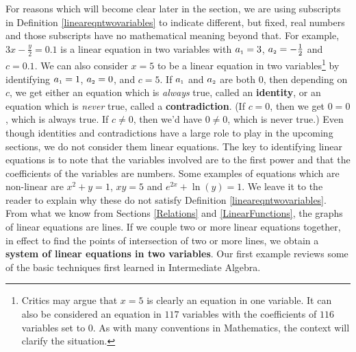 For reasons which will become clear later in the section, we are using subscripts in Definition \ref{lineareqntwovariables} to indicate different, but fixed, real numbers and those subscripts have no mathematical meaning beyond that.  For example, $3x - \frac{y}{2} = 0.1$ is a linear equation in two variables with $a_{\mbox{\tiny$1$}} = 3$, $a_{\mbox{\tiny$2$}} = -\frac{1}{2}$ and $c = 0.1$.  We can also consider $x = 5$ to be a linear equation in two variables\footnote{Critics may argue that $x=5$ is clearly an equation in one variable.  It can also be considered an equation in $117$ variables with the coefficients of $116$ variables set to $0$.  As with many conventions in Mathematics, the context will clarify the situation.} by identifying $a_{\mbox{\tiny$1$}} = 1$, $a_{\mbox{\tiny$2$}} = 0$, and $c = 5$.  If $a_{\mbox{\tiny$1$}}$ and $a_{\mbox{\tiny$2$}}$ are both $0$, then depending on $c$, we get either an equation which is \textit{always} true, called an   \textbf{identity}, or an equation which is \textit{never} true, called a   \textbf{contradiction}. (If $c = 0$, then we get $0 = 0$, which is always true.  If $c \neq 0$, then we'd have  $0 \neq 0$, which is never true.)  Even though identities and contradictions have a large role to play in the upcoming sections, we do not consider them linear equations.  The key to identifying linear equations is to note that the variables involved are to the first power and that the coefficients of the variables are numbers.  Some examples of equations which are non-linear are $x^2 + y = 1$, $xy = 5$ and $e^{2x} + \ln(y) = 1$.  We leave it to the reader to explain why these do not satisfy Definition \ref{lineareqntwovariables}.  From what we know from Sections \ref{Relations} and \ref{LinearFunctions}, the graphs of linear equations are lines.  If we couple two or more linear equations together, in effect to find the points of intersection of two or more lines, we obtain a \textbf{system of linear equations in two variables}.  Our first example reviews some of the basic techniques first learned in Intermediate Algebra.

